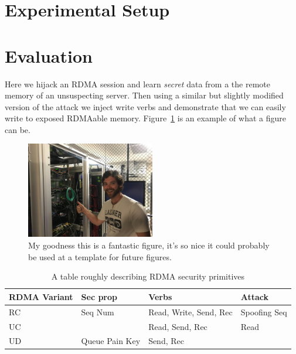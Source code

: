 \section{Experimental Setup}
\label{sec:eval}

\section{Evaluation}

Here we hijack an RDMA session and learn \emph{secret} data from a the remote
memory of an unsuspecting server. Then using a similar but slightly modified
version of the attack we inject write verbs and demonstrate that we can easily
write to exposed RDMAable memory. Figure~\ref{fig:tmp} is an example of what a
figure can be.

\begin{figure}[ht]
    \includegraphics[width=0.5\textwidth]{fig/tmp.jpg}
    \centering
    \caption{My goodness this is a fantastic figure, it's so nice it could probably be used at a template for future figures.}
    \label{fig:tmp}
\end{figure}

\begin{table}
    \begin{tabular}{p{1.5cm}|p{1.5cm}|p{1.5cm}|p{1.5cm}}
        \hline
        \hline
    RDMA Variant & Sec prop & Verbs & Attack \\
        \hline
        RC & Seq Num & Read, Write, Send, Rec & Spoofing Seq \\
        \hline
        UC & & Read, Send, Rec & Read  \\
        \hline
        UD & Queue Pain Key & Send, Rec & \\
        \hline
    \end{tabular}
    \caption{A table roughly describing RDMA security primitives}
    \label{table:attacks}
\end{table}
